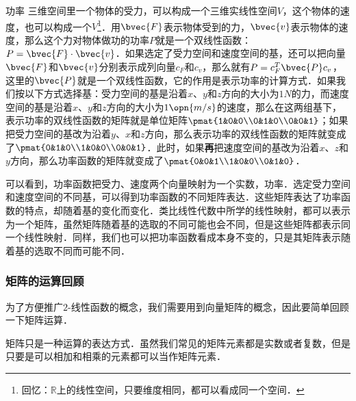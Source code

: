 \begin{example}{功率}
三维空间里一个物体的受力，可以构成一个三维实线性空间$V$，这个物体的速度，也可以构成一个$V$\footnote{回忆：$\mathbb{R}$上的线性空间，只要维度相同，都可以看成同一个空间．}．用$\bvec{F}$表示物体受到的力，$\bvec{v}$表示物体的速度，那么这个力对物体做功的功率$P$就是一个双线性函数：$P=\bvec{F}\cdot\bvec{v}$．如果选定了受力空间和速度空间的基，还可以把向量$\bvec{F}$和$\bvec{v}$分别表示成列向量$c_F$和$c_v$，那么就有$P=c^T_F\bvec{P}c_v$，这里的$\bvec{P}$就是一个双线性函数，它的作用是表示功率的计算方式．如果我们按以下方式选择基：受力空间的基是沿着$x$、$y$和$z$方向的大小为$1N$的力，而速度空间的基是沿着$x$、$y$和$z$方向的大小为$1\opn{m/s}$的速度，那么在这两组基下，表示功率的双线性函数的矩阵就是单位矩阵$\pmat{1&0&0\\0&1&0\\0&0&1}$；如果把受力空间的基改为沿着$y$、$x$和$z$方向，那么表示功率的双线性函数的矩阵就变成了$\pmat{0&1&0\\1&0&0\\0&0&1}$．此时，如果\textbf{再}把速度空间的基改为沿着$x$、$z$和$y$方向，那么功率函数的矩阵就变成了$\pmat{0&0&1\\1&0&0\\0&1&0}$．
\end{example}

可以看到，功率函数把受力、速度两个向量映射为一个实数，功率．选定受力空间和速度空间的不同基，可以得到功率函数的不同矩阵表达．这些矩阵表达了功率函数的特点，却随着基的变化而变化．类比线性代数中所学的线性映射，都可以表示为一个矩阵，虽然矩阵随着基的选取的不同可能也会不同，但是这些矩阵都表示同一个线性映射．同样，我们也可以把功率函数看成本身不变的，只是其矩阵表示随着基的选取不同而可能不同．

\subsubsection{矩阵的运算回顾}

为了方便推广$2$-线性函数的概念，我们需要用到向量矩阵的概念，因此要简单回顾一下矩阵运算．

矩阵只是一种运算的表达方式．虽然我们常见的矩阵元素都是实数或者复数，但是只要是可以相加和相乘的元素都可以当作矩阵元素．

